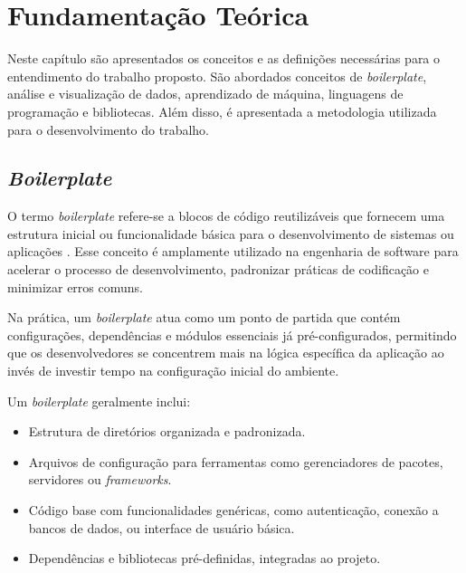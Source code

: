 
\chapter{Fundamentação Teórica}
\label{cha:fundamentacao-teorica}

Neste capítulo são apresentados os conceitos e as definições necessárias para o entendimento do trabalho proposto. São abordados conceitos de \textit{boilerplate}, análise e visualização de dados, aprendizado de máquina, linguagens de programação e bibliotecas. Além disso, é apresentada a metodologia utilizada para o desenvolvimento do trabalho.

\section{\textit{Boilerplate}}
\label{sec:boilerplate}

O termo \textit{boilerplate} refere-se a blocos de código reutilizáveis que fornecem uma estrutura inicial ou funcionalidade básica para o desenvolvimento de sistemas ou aplicações \citep{syb_boilerplate}. Esse conceito é amplamente utilizado na engenharia de software para acelerar o processo de desenvolvimento, padronizar práticas de codificação e minimizar erros comuns.

Na prática, um \textit{boilerplate} atua como um ponto de partida que contém configurações, dependências e módulos essenciais já pré-configurados, permitindo que os desenvolvedores se concentrem mais na lógica específica da aplicação ao invés de investir tempo na configuração inicial do ambiente.

Um \textit{boilerplate} geralmente inclui:
\begin{itemize}
    \item Estrutura de diretórios organizada e padronizada.
    \item Arquivos de configuração para ferramentas como gerenciadores de pacotes, servidores ou \textit{frameworks}.
    \item Código base com funcionalidades genéricas, como autenticação, conexão a bancos de dados, ou interface de usuário básica.
    \item Dependências e bibliotecas pré-definidas, integradas ao projeto.
\end{itemize}

